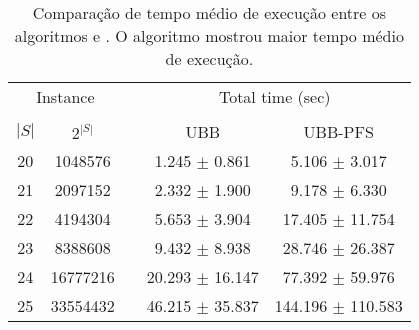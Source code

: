 \begin{table}
\centering
\footnotesize
\begin{tabular}{cc c cc}
\toprule
\multicolumn{2}{c}{Instance} & \phantom{} & \multicolumn{2}{c}{Total time (sec)} \\
\cline{1-2}\cline{4-5}\\
$|S|$ & $2^{|S|}$ && UBB & UBB-PFS \\
20 & 1048576 &&  1.245 $\pm$ 0.861 & 5.106 $\pm$ 3.017 \\
21 & 2097152 &&  2.332 $\pm$ 1.900 & 9.178 $\pm$ 6.330 \\
22 & 4194304 &&  5.653 $\pm$ 3.904 & 17.405 $\pm$ 11.754 \\
23 & 8388608 &&  9.432 $\pm$ 8.938 & 28.746 $\pm$ 26.387 \\
24 & 16777216 &&  20.293 $\pm$ 16.147 & 77.392 $\pm$ 59.976 \\
25 & 33554432 &&  46.215 $\pm$ 35.837 & 144.196 $\pm$ 110.583 \\
\end{tabular}
\caption{Comparação de tempo médio de execução entre os algoritmos 
 e . O algoritmo  mostrou
maior tempo médio de execução.}
\label{tab:ubbpfs_vs_ubb_time}
\end{table}

